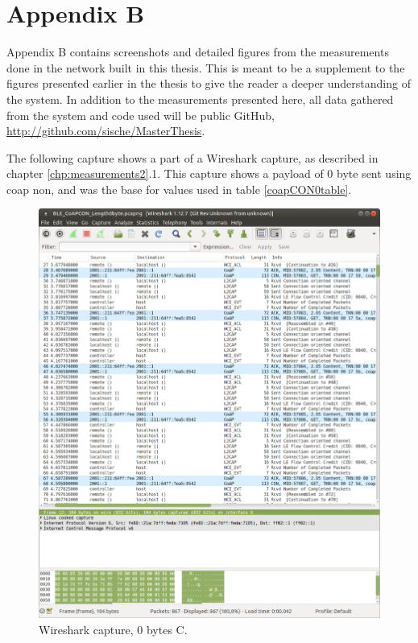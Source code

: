 \chapter{Appendix B}
\label{chp:appendixb}

Appendix B contains screenshots and detailed figures from the measurements done in the network built in this thesis. This is meant to be a supplement to the figures presented earlier in the thesis to give the reader a deeper understanding of the system. In addition to the measurements presented here, all data gathered from the system and code used will be public GitHub, \url{http://github.com/sische/MasterThesis}. 

The following capture shows a part of a Wireshark capture, as described in chapter \ref{chp:measurements2}.1. This capture shows a \gls{payload} of 0 byte sent using \gls{coap} \gls{non}, and was the base for values used in table \ref{coapCON0table}. 

\begin{figure}[ht]
    \centering
    \includegraphics[width=1.1\textwidth]{0byteCONwireshark.png}    
    \caption{Wireshark capture, 0 bytes C. }
    \label{fig:wireshark0byteCONappendixB}
\end{figure}


